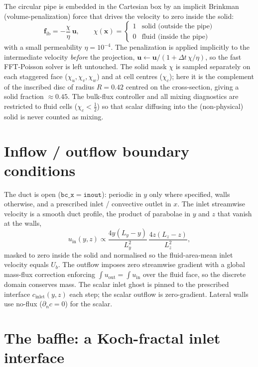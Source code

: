 \documentclass[11pt]{article}
\newcommand{\uvec}{\bm{u}}
\begin{document}
The circular pipe is embedded in the Cartesian box by an implicit
Brinkman (volume-penalization) force that drives the velocity to zero
inside the solid:
\begin{equation}
  \bm{f}_{\mathrm{ib}} = -\frac{\chi}{\eta}\,\uvec,
  \qquad
  \chi(\bm{x}) =
    \begin{cases} 1 & \text{solid (outside the pipe)}\\
                  0 & \text{fluid (inside the pipe)} \end{cases}
\end{equation}
with a small permeability $\eta = 10^{-4}$. The penalization is applied
implicitly to the intermediate velocity \emph{before} the projection,
$\uvec \leftarrow \uvec/(1 + \Delta t\,\chi/\eta)$, so the fast
FFT-Poisson solver is left untouched. The solid mask $\chi$ is sampled
separately on each staggered face ($\chi_u,\chi_v,\chi_w$) and at cell
centres ($\chi_c$); here it is the complement of the inscribed disc of
radius $R=0.42$ centred on the cross-section, giving a solid fraction
$\approx 0.45$. The bulk-flux controller and all mixing diagnostics are
restricted to fluid cells ($\chi_c < \tfrac12$) so that scalar diffusing
into the (non-physical) solid is never counted as mixing.

\section{Inflow / outflow boundary conditions}

The duct is open ($\mathtt{bc\_x = inout}$): periodic in $y$ only where
specified, walls otherwise, and a prescribed inlet / convective outlet in
$x$. The inlet streamwise velocity is a smooth duct profile, the product
of parabolae in $y$ and $z$ that vanish at the walls,
\begin{equation}
  u_{\mathrm{in}}(y,z) \propto
    \frac{4y(L_y - y)}{L_y^2}\,\frac{4z(L_z - z)}{L_z^2},
\end{equation}
masked to zero inside the solid and normalised so the fluid-area-mean
inlet velocity equals $U_b$. The outflow imposes zero streamwise gradient
with a global mass-flux correction enforcing
$\int u_{\mathrm{out}} = \int u_{\mathrm{in}}$ over the fluid face, so the
discrete domain conserves mass. The scalar inlet ghost is pinned to the
prescribed interface $c_{\mathrm{inlet}}(y,z)$ each step; the scalar
outflow is zero-gradient. Lateral walls use no-flux ($\partial_n c = 0$)
for the scalar.

\section{The baffle: a Koch-fractal inlet interface}
\label{sec:koch}
\end{document}
